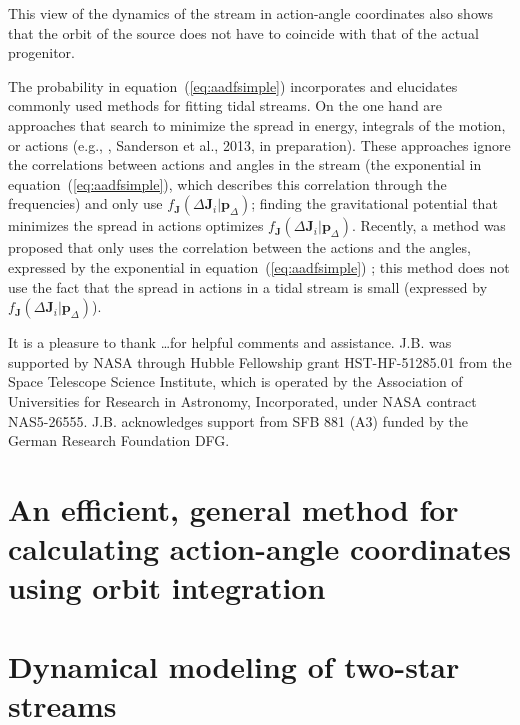\documentclass[12pt,preprint]{aastex}
\newcommand{\etal}{et al.}
\newcommand{\eg}{e.g.}
\newcommand{\eqnname}{equation}
\renewcommand{\vec}[1]{\ensuremath{\mathbf{#1}}}
\newcommand{\vecj}{\ensuremath{\vec{J}}}
\newcommand{\paramsdiff}{\ensuremath{\vec{p}_\Delta}}
\begin{document}
This view of the dynamics of the stream in action-angle coordinates
also shows that the orbit of the source does not have to coincide with
that of the actual progenitor. 

The probability in \eqnname~(\ref{eq:aadfsimple}) incorporates and
elucidates commonly used methods for fitting tidal streams. On the one
hand are approaches that search to minimize the spread in energy,
integrals of the motion, or actions (\eg,
\citealt{Binney08a,Penarrubia12a}, Sanderson \etal, 2013, in
preparation). These approaches ignore the correlations between actions
and angles in the stream (the exponential in
\eqnname~(\ref{eq:aadfsimple}), which describes this correlation
through the frequencies) and only use $f_{\vecj}(\Delta
\vecj_i|\paramsdiff)$; finding the gravitational potential that
minimizes the spread in actions optimizes $f_{\vecj}(\Delta
\vecj_i|\paramsdiff)$. Recently, a method was proposed that only uses
the correlation between the actions and the angles, expressed by the
exponential in \eqnname~(\ref{eq:aadfsimple}) \citep{Sanders13b}; this
method does not use the fact that the spread in actions in a tidal
stream is small (expressed by $f_{\vecj}(\Delta
\vecj_i|\paramsdiff)$).



\acknowledgements It is a pleasure to thank \dots for helpful comments
and assistance. J.B. was supported by NASA through Hubble Fellowship
grant HST-HF-51285.01 from the Space Telescope Science Institute,
which is operated by the Association of Universities for Research in
Astronomy, Incorporated, under NASA contract NAS5-26555. J.B.
acknowledges support from SFB 881 (A3) funded by the German
Research Foundation DFG.


\appendix

\section{An efficient, general method for calculating action-angle coordinates using orbit integration}\label{sec:aa}


\section{Dynamical modeling of two-star streams}\label{sec:twostar}

\end{document}
